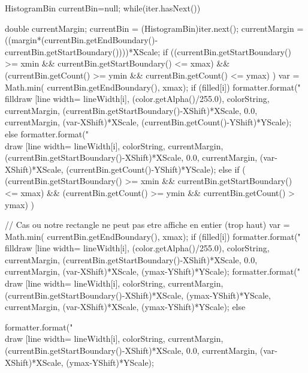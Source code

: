 \begin{code}
\begin{hide}
{{{         HistogramBin currentBin=null;
         while(iter.hasNext()) {
            double currentMargin;
            currentBin = (HistogramBin)iter.next();
            currentMargin = ((margin*(currentBin.getEndBoundary()-currentBin.getStartBoundary())))*XScale;
            if ((currentBin.getStartBoundary() >= xmin && currentBin.getStartBoundary() <= xmax)
               && (currentBin.getCount() >= ymin && currentBin.getCount() <= ymax) )
            {
               var = Math.min( currentBin.getEndBoundary(), xmax);
               if (filled[i]) {
                  formatter.format("\\filldraw [line width=%
                        lineWidth[i], (color.getAlpha()/255.0), colorString,
                        currentMargin, (currentBin.getStartBoundary()-XShift)*XScale, 0.0,
                        currentMargin, (var-XShift)*XScale, (currentBin.getCount()-YShift)*YScale);
              }
              else {
                  formatter.format("\\draw [line width=%
                        lineWidth[i], colorString,
                        currentMargin, (currentBin.getStartBoundary()-XShift)*XScale, 0.0,
                        currentMargin, (var-XShift)*XScale, (currentBin.getCount()-YShift)*YScale);
              }
            }
            else if (   (currentBin.getStartBoundary() >= xmin && currentBin.getStartBoundary() <= xmax)
                        && (currentBin.getCount() >= ymin && currentBin.getCount() > ymax) )
            { // Cas ou notre rectangle ne peut pas etre affiche en entier (trop haut)
               var = Math.min( currentBin.getEndBoundary(), xmax);
               if (filled[i]) {
                  formatter.format("\\filldraw [line width=%
                        lineWidth[i], (color.getAlpha()/255.0), colorString,
                        currentMargin, (currentBin.getStartBoundary()-XShift)*XScale, 0.0,
                        currentMargin, (var-XShift)*XScale, (ymax-YShift)*YScale);
                  formatter.format("\\draw [line width=%
                        lineWidth[i], colorString,
                        currentMargin, (currentBin.getStartBoundary()-XShift)*XScale, (ymax-YShift)*YScale,
                        currentMargin, (var-XShift)*XScale, (ymax-YShift)*YScale);
               }
               else {
                  formatter.format("\\draw [line width=%
                        lineWidth[i], colorString,
                        currentMargin, (currentBin.getStartBoundary()-XShift)*XScale, 0.0,
                        currentMargin, (var-XShift)*XScale, (ymax-YShift)*YScale);

}}}}}}
\end{hide}
\end{code}

